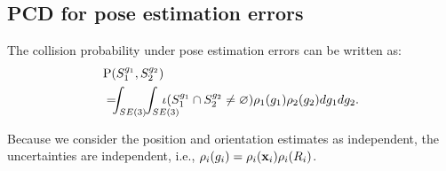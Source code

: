 \documentclass[conference]{IEEEtran}
\newcommand{\IR}{\mathbb{R}}
\newcommand{\xx}{{\bf x}}
\newcommand{\pp}{{\bf p}}
\newcommand{\PP}{\text{P}}
\begin{document}
\subsection{PCD for pose estimation errors}
The collision probability under pose estimation errors can be written as:
\begin{equation}
\label{eq:method:pose-collision-probability}
\begin{aligned}
&\PP(S_1^{g_1}, S_2^{g_2})\hskip -0.03in \\
&=\hskip -0.08in \int_{SE(3)}\hskip -0.04in\int_{SE(3)}
\hskip -0.22in \iota(S_1^{g_1}\cap S_2^{g_2} \neq \varnothing) \rho_1(g_1)\rho_2(g_2) dg_1 dg_2 .
\end{aligned}
\end{equation}


Because we consider the position and orientation estimates as independent, the uncertainties are independent, i.e., $\rho_i(g_i)=\rho_i(\xx_i)\rho_i(R_i)$.
\end{document}
